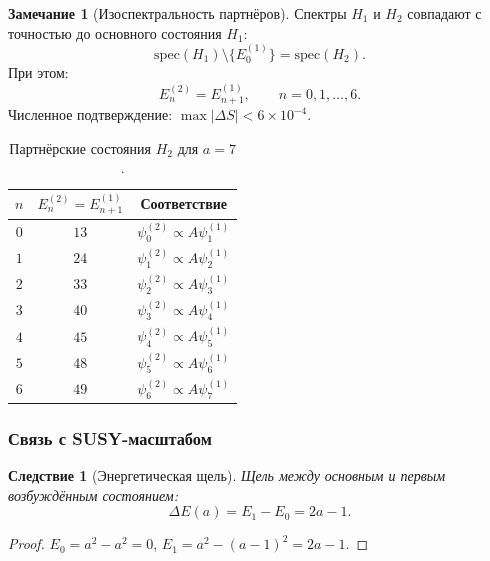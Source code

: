 \documentclass[11pt,a4paper]{article}
\newtheorem{corollary}[theorem]{Следствие}
\theoremstyle{definition}
\newtheorem{remark}[theorem]{Замечание}
\begin{document}
\begin{remark}[Изоспектральность партнёров]
Спектры $H_1$ и $H_2$ совпадают с точностью до основного состояния 
$H_1$:
\begin{equation}
    \mathrm{spec}(H_1) \setminus \{E_0^{(1)}\} = \mathrm{spec}(H_2).
\end{equation}
При этом:
\begin{equation}
    E_n^{(2)} = E_{n+1}^{(1)}, \qquad n = 0, 1, \ldots, 6.
\end{equation}
Численное подтверждение: $\max|\Delta S| < 6 \times 10^{-4}$.
\end{remark}

\begin{table}[htbp]
\centering
\caption{Партнёрские состояния \texorpdfstring{$H_2$}{H\_2} для \texorpdfstring{$a = 7$}{a = 7}.}
\label{tab:partner-states}
\begin{tabular}{ccc}
\toprule
$n$ & $E_n^{(2)} = E_{n+1}^{(1)}$ & Соответствие \\
\midrule
$0$ & $13$ & $\psi_0^{(2)} \propto A \psi_1^{(1)}$ \\
$1$ & $24$ & $\psi_1^{(2)} \propto A \psi_2^{(1)}$ \\
$2$ & $33$ & $\psi_2^{(2)} \propto A \psi_3^{(1)}$ \\
$3$ & $40$ & $\psi_3^{(2)} \propto A \psi_4^{(1)}$ \\
$4$ & $45$ & $\psi_4^{(2)} \propto A \psi_5^{(1)}$ \\
$5$ & $48$ & $\psi_5^{(2)} \propto A \psi_6^{(1)}$ \\
$6$ & $49$ & $\psi_6^{(2)} \propto A \psi_7^{(1)}$ \\
\bottomrule
\end{tabular}
\end{table}
                                  
\subsubsection{Связь с SUSY-масштабом}

\begin{corollary}[Энергетическая щель]
\label{cor:membrane-gap}
Щель между основным и первым возбуждённым состоянием:
\begin{equation}
    \boxed{
    \Delta E(a) = E_1 - E_0 = 2a - 1.
    }
    \label{eq:membrane-deltaE}
\end{equation}
\end{corollary}

\begin{proof}
$E_0 = a^2 - a^2 = 0$, $E_1 = a^2 - (a-1)^2 = 2a - 1$.
\end{proof}
\end{document}
